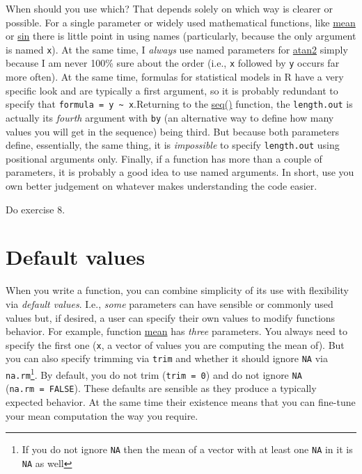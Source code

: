\documentclass[
]{book}
\begin{document}
When should you use which? That depends solely on which way is clearer or possible. For a single parameter or widely used mathematical functions, like \href{https://stat.ethz.ch/R-manual/R-devel/library/base/html/mean.html}{mean} or \href{https://stat.ethz.ch/R-manual/R-devel/library/base/html/Trig.html}{sin} there is little point in using names (particularly, because the only argument is named \texttt{x}). At the same time, I \emph{always} use named parameters for \href{https://stat.ethz.ch/R-manual/R-devel/library/base/html/Trig.html}{atan2} simply because I am never 100\% sure about the order (i.e., \texttt{x} followed by \texttt{y} occurs far more often). At the same time, formulas for statistical models in R have a very specific look and are typically a first argument, so it is probably redundant to specify that \texttt{formula\ =\ y\ \textasciitilde{}\ x}.Returning to the \href{https://stat.ethz.ch/R-manual/R-devel/library/base/html/seq.html}{seq()} function, the \texttt{length.out} is actually its \emph{fourth} argument with \texttt{by} (an alternative way to define how many values you will get in the sequence) being third. But because both parameters define, essentially, the same thing, it is \emph{impossible} to specify \texttt{length.out} using positional arguments only. Finally, if a function has more than a couple of parameters, it is probably a good idea to use named arguments. In short, use you own better judgement on whatever makes understanding the code easier.

Do exercise 8.

\hypertarget{default-values}{%
\section{Default values}\label{default-values}}

When you write a function, you can combine simplicity of its use with flexibility via \emph{default values}. I.e., \emph{some} parameters can have sensible or commonly used values but, if desired, a user can specify their own values to modify functions behavior. For example, function \href{https://stat.ethz.ch/R-manual/R-devel/library/base/html/mean.html}{mean} has \emph{three} parameters. You always need to specify the first one (\texttt{x}, a vector of values you are computing the mean of). But you can also specify trimming via \texttt{trim} and whether it should ignore \texttt{NA} via \texttt{na.rm}\footnote{If you do not ignore \texttt{NA} then the mean of a vector with at least one \texttt{NA} in it is \texttt{NA} as well}. By default, you do not trim (\texttt{trim\ =\ 0}) and do not ignore \texttt{NA} (\texttt{na.rm\ =\ FALSE}). These defaults are sensible as they produce a typically expected behavior. At the same time their existence means that you can fine-tune your mean computation the way you require.
\end{document}
